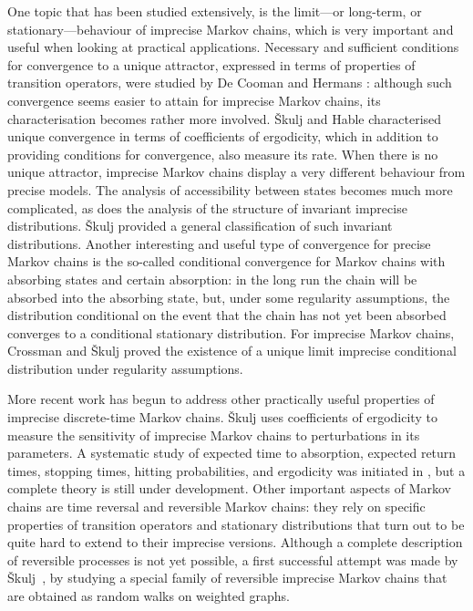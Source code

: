 \documentclass[11pt,dvipsnames,usenames,a4paper]{article}
\begin{document}
One topic that has been studied extensively, is the limit---or long-term, or stationary---behaviour of imprecise Markov chains, which is very important and useful when looking at practical applications.
Necessary and sufficient conditions for convergence to a unique attractor, expressed in terms of properties of transition operators, were studied by De Cooman and Hermans \cite{cooman2008,hermans2012}: although such convergence seems easier to attain for imprecise Markov chains, its characterisation becomes rather more involved.
Škulj and Hable \cite{skulj2013} characterised unique convergence in terms of coefficients of ergodicity, which in addition to providing conditions for convergence, also measure its rate. 
When there is no unique attractor, imprecise Markov chains display a very different behaviour from precise models. 
The analysis of accessibility between states becomes much more complicated, as does the analysis of the structure of invariant imprecise distributions. 
Škulj \cite{skulj:13b} provided a general classification of such invariant distributions. Another interesting and useful type of convergence for precise Markov chains is the so-called conditional convergence for Markov chains with absorbing states and certain absorption: in the long run the chain will be absorbed into the absorbing state, but, under some regularity assumptions, the distribution conditional on the event that the chain has not yet been absorbed converges to a conditional stationary distribution. 
For imprecise Markov chains, Crossman and Škulj \cite{Crossman:2010} proved the existence of a unique limit imprecise conditional distribution under regularity assumptions. 

More recent work has begun to address other practically useful properties of imprecise discrete-time Markov chains.
Škulj \cite{skulj:2016b} uses coefficients of ergodicity to measure the sensitivity of imprecise Markov chains to perturbations in its parameters. 
A systematic study of expected time to absorption, expected return times, stopping times, hitting  probabilities, and ergodicity was initiated in \cite{troffaes:2013, cooman2015:markovergodic}, but a complete theory is still under development. 
Other important aspects of Markov chains are time reversal and reversible Markov chains:
they rely on specific properties of transition operators and stationary distributions that turn out to be quite hard to extend to their imprecise versions. 
Although a complete description of reversible processes is not yet possible, a first successful attempt was made by Škulj~\cite{skulj:16}, by studying a special family of reversible imprecise Markov chains that are obtained as random walks on weighted graphs. 
\end{document}
